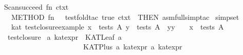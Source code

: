 \begin{isabellebody}
Scan{}succeed\ {}fn\ ctxt\ {}{}\isanewline
\ \ METHOD\ {}fn\ {}\ {}{}\ test{}fold{}tac\ true\ ctxt\ {}\ THEN\ asm{}full{}simp{}tac\ %
\isaantiq
simpset{}%
\endisaantiq
\ {}{}{}\isanewline
{}%
\endisatagML
{\isafoldML}%
%
\isadelimML
\isanewline
%
\endisadelimML
\isanewline
{}\isamarkupfalse%
\ {}\ kat{}\ test{}closure{}example{}\ {}{}x\ {}\ tests\ A{}\ y\ {}\ tests\ A{}\ {}\ {}{}y{}{}{}y\ {}\ {}\ {}\ {}x{}\ {}\ tests\ A{}\isanewline
%
\isadelimproof
\ \ %
\endisadelimproof
%
\isatagproof
{}\isamarkupfalse%
\ test{}closure%
\endisatagproof
{\isafoldproof}%
%
\isadelimproof
\isanewline
%
\endisadelimproof
\isanewline
{}\isamarkupfalse%
\ {}a\ kat{}expr\ {}\ KATLeaf\ {}a\isanewline
\ \ \ \ \ \ \ \ \ \ \ \ \ \ \ \ \ \ \ \ \ {}\ KATPlus\ {}{}a\ kat{}expr{}\ {}{}a\ kat{}expr{}\isanewline

\end{isabellebody}
